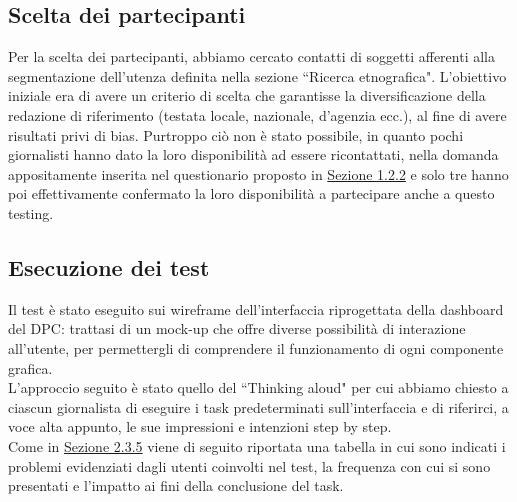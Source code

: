 \subsection{Scelta dei partecipanti}
\label{ss:scelta-partecipanti}
Per la scelta dei partecipanti, abbiamo cercato contatti di soggetti afferenti alla segmentazione dell'utenza definita nella sezione ``Ricerca etnografica". L'obiettivo iniziale era di avere un criterio di scelta che garantisse la diversificazione della redazione di riferimento (testata locale, nazionale, d'agenzia ecc.), al fine di avere risultati privi di bias.
Purtroppo ciò non è stato possibile, in quanto pochi giornalisti hanno dato la loro disponibilità ad essere ricontattati, nella domanda appositamente inserita nel questionario proposto in \hyperref[ss:questionario-online]{Sezione 1.2.2} e solo tre hanno poi effettivamente confermato la loro disponibilità a partecipare anche a questo testing.

\subsection{Esecuzione dei test}
\label{ss:esecuzione-test}
Il test è stato eseguito sui wireframe dell'interfaccia riprogettata della dashboard del DPC: trattasi di un mock-up che offre diverse possibilità di interazione all'utente, per permettergli di comprendere il funzionamento di ogni componente grafica.\\
L'approccio seguito è stato quello del ``Thinking aloud" per cui abbiamo chiesto a ciascun giornalista di eseguire i task predeterminati sull'interfaccia e di riferirci, a voce alta appunto, le sue impressioni e intenzioni step by step.\\
Come in \hyperref[sss:approccio-adottato]{Sezione 2.3.5} viene di seguito riportata una tabella in cui sono indicati i problemi evidenziati dagli utenti coinvolti nel test, la frequenza con cui si sono presentati e l'impatto ai fini della conclusione del task.

